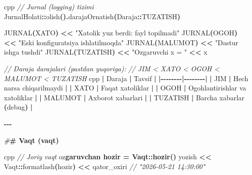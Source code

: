\documentclass[a4paper,11pt,twoside,openright]{book}
\newenvironment{Shaded}{\begin{snugshade}}{\end{snugshade}}
\newcommand{\CharTok}[1]{\textcolor[rgb]{0.31,0.60,0.02}{#1}}
\newcommand{\CommentTok}[1]{\textcolor[rgb]{0.56,0.35,0.01}{\textit{#1}}}
\newcommand{\ErrorTok}[1]{\textcolor[rgb]{0.64,0.00,0.00}{\textbf{#1}}}
\newcommand{\NormalTok}[1]{#1}
\newcommand{\OperatorTok}[1]{\textcolor[rgb]{0.81,0.36,0.00}{\textbf{#1}}}
\newcommand{\PreprocessorTok}[1]{\textcolor[rgb]{0.56,0.35,0.01}{\textit{#1}}}
\newcommand{\StringTok}[1]{\textcolor[rgb]{0.31,0.60,0.02}{#1}}
\begin{document}
\begin{Shaded}
\begin{Highlighting}[]
\ErrorTok{\textasciigrave{}\textasciigrave{}\textasciigrave{}}\NormalTok{cpp}
\CommentTok{// Jurnal (logging) tizimi}
\NormalTok{JurnalHolati}\OperatorTok{::}\NormalTok{olish}\OperatorTok{().}\NormalTok{darajaOrnatish}\OperatorTok{(}\NormalTok{Daraja}\OperatorTok{::}\NormalTok{TUZATISH}\OperatorTok{)}

\NormalTok{JURNAL}\OperatorTok{(}\NormalTok{XATO}\OperatorTok{)} \OperatorTok{\textless{}\textless{}} \StringTok{"Xatolik yuz berdi: fayl topilmadi"}
\NormalTok{JURNAL}\OperatorTok{(}\NormalTok{OGOH}\OperatorTok{)} \OperatorTok{\textless{}\textless{}} \StringTok{"Eski konfiguratsiya ishlatilmoqda"}
\NormalTok{JURNAL}\OperatorTok{(}\NormalTok{MALUMOT}\OperatorTok{)} \OperatorTok{\textless{}\textless{}} \StringTok{"Dastur ishga tushdi"}
\NormalTok{JURNAL}\OperatorTok{(}\NormalTok{TUZATISH}\OperatorTok{)} \OperatorTok{\textless{}\textless{}} \StringTok{"O\textquotesingle{}zgaruvchi x = "} \OperatorTok{\textless{}\textless{}}\NormalTok{ x}

\CommentTok{// Daraja darajalari (pastdan yuqoriga):}
\CommentTok{// JIM \textless{} XATO \textless{} OGOH \textless{} MALUMOT \textless{} TUZATISH}
\ErrorTok{\textasciigrave{}\textasciigrave{}\textasciigrave{}}\NormalTok{cpp}
\OperatorTok{|}\NormalTok{ Daraja }\OperatorTok{|}\NormalTok{ Tavsif }\OperatorTok{|}
\OperatorTok{|{-}{-}{-}{-}{-}{-}{-}{-}|{-}{-}{-}{-}{-}{-}{-}{-}|}
\OperatorTok{|} \ErrorTok{\textasciigrave{}}\NormalTok{JIM}\ErrorTok{\textasciigrave{}} \OperatorTok{|}\NormalTok{ Hech narsa chiqarilmaydi }\OperatorTok{|}
\OperatorTok{|} \ErrorTok{\textasciigrave{}}\NormalTok{XATO}\ErrorTok{\textasciigrave{}} \OperatorTok{|}\NormalTok{ Faqat xatoliklar }\OperatorTok{|}
\OperatorTok{|} \ErrorTok{\textasciigrave{}}\NormalTok{OGOH}\ErrorTok{\textasciigrave{}} \OperatorTok{|}\NormalTok{ Ogohlantirishlar va xatoliklar }\OperatorTok{|}
\OperatorTok{|} \ErrorTok{\textasciigrave{}}\NormalTok{MALUMOT}\ErrorTok{\textasciigrave{}} \OperatorTok{|}\NormalTok{ Axborot xabarlari }\OperatorTok{|}
\OperatorTok{|} \ErrorTok{\textasciigrave{}}\NormalTok{TUZATISH}\ErrorTok{\textasciigrave{}} \OperatorTok{|}\NormalTok{ Barcha xabarlar }\OperatorTok{(}\NormalTok{debug}\OperatorTok{)} \OperatorTok{|}

\OperatorTok{{-}{-}{-}}

\PreprocessorTok{\#}\ErrorTok{\# Vaqt (\textasciigrave{}vaqt\textasciigrave{})}

\ErrorTok{\textasciigrave{}\textasciigrave{}\textasciigrave{}}\NormalTok{cpp}
\CommentTok{// Joriy vaqt}
\NormalTok{o}\CharTok{\textquotesingle{}z}\ErrorTok{garuvchan hozir = Vaqt::hozir()}
\NormalTok{yozish }\OperatorTok{\textless{}\textless{}}\NormalTok{ Vaqt}\OperatorTok{::}\NormalTok{formatlash}\OperatorTok{(}\NormalTok{hozir}\OperatorTok{)} \OperatorTok{\textless{}\textless{}}\NormalTok{ qator\_oxiri}
\CommentTok{// "2026{-}05{-}21 14:30:00"}


\end{Highlighting}
\end{Shaded}
\end{document}
